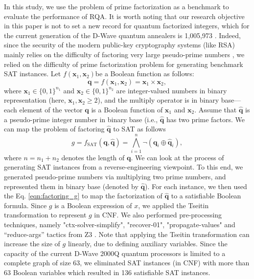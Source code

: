\documentclass[fleqn,10pt]{wlscirep}
\begin{document}
In this study, we use the problem of prime factorization as a benchmark to evaluate the performance of RQA. It is worth noting that our research objective in this paper is not to set a new record for quantum factorized integers, which for the current generation of the D-Wave quantum annealers is 1,005,973 \cite{peng2019factoring}. Indeed, since the security of the modern public-key cryptography systems (like RSA) mainly relies on the difficulty of factoring very large pseudo-prime numbers \cite{dridi2017prime,peng2019factoring}, we relied on the difficulty of prime factorization problem for generating benchmark SAT instances. 
Let $f(\mathbf{x}_1, \mathbf{x}_2)$be a Boolean function as follows:
\begin{equation}
	\label{eqn:factoring_mul}
	\mathbf{q} = f(\mathbf{x}_1, \mathbf{x}_2) = \mathbf{x}_1 \times \mathbf{x}_2,
\end{equation}
where $\mathbf{x}_1 \in \{0,1\}^{n_1}$ and $\mathbf{x}_2 \in \{0,1\}^{n_2}$ are integer-valued numbers in binary representation (here, $\mathbf{x}_1, \mathbf{x}_2 \geq2$), and the multiply operator is in binary base—each element of the vector $\mathbf{q}$ is a Boolean function of $\mathbf{x}_1$ and $\mathbf{x}_2$. Assume that $\hat{\mathbf{q}}$ is a pseudo-prime integer number in binary base (i.e., $\hat{\mathbf{q}}$ has two prime factors. We can map the problem of factoring $\hat{\mathbf{q}}$ to SAT as follows
\begin{equation}
	\label{eqn:factoring_g}
	g = f_{\mathrm{SAT}}\left({\mathbf{q}, \hat{\mathbf{q}}}\right) 
	= \bigwedge_{i=1}^{n}{\neg{\left({\mathbf{q}_i \oplus \hat{\mathbf{q}}_i}\right)}},
\end{equation}
where $n=n_1 + n_2$ denotes the length of $\mathbf{q}$. We can look at the process of generating SAT instances from a reverse-engineering viewpoint. To this end, we generated pseudo-prime numbers via multiplying two prime numbers, and represented them in binary base (denoted by $\hat{\mathbf{q}}$). For each instance, we then used the Eq. \eqref{eqn:factoring_g} to map the factorization of $\hat{\mathbf{q}}$ to a satisfiable Boolean formula. Since ${g}$ is a Boolean expression of ${x}$, we applied the Tseitin transformation \cite{li2019clausal} to represent ${g}$ in CNF. We also performed pre-processing techniques, namely  "ctx-solver-simplify", "recover-01", "propagate-values" and “reduce-args” tactics from Z3 \cite{de2013strategy}. Note that applying the Tseitin transformation can increase the size of ${g}$ linearly, due to defining auxiliary variables. Since the capacity of the current D-Wave 2000Q quantum processors is limited to a complete graph of size 63, we eliminated SAT instances (in CNF) with more than 63 Boolean variables which resulted in 136 satisfiable SAT instances.
\end{document}
